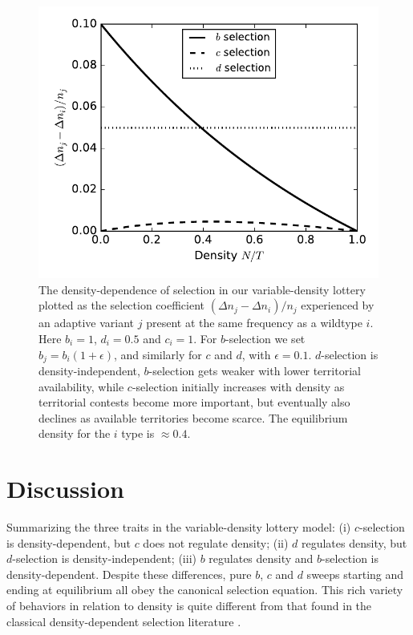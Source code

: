\documentclass[12pt]{article}
\begin{document}
\begin{figure}
\centering
\includegraphics[scale=0.8]{DDS_lottery.pdf}
\caption{\label{fig:DDS_lottery} The density-dependence of selection in our variable-density lottery plotted as the selection coefficient $(\Delta n_j-\Delta n_i)/n_j$ experienced by an adaptive variant $j$ present at the same frequency as a wildtype $i$. Here $b_i=1$, $d_i=0.5$ and $c_i=1$. For $b$-selection we set $b_j=b_i(1+\epsilon)$, and similarly for $c$ and $d$, with $\epsilon=0.1$. $d$-selection is density-independent, $b$-selection gets weaker with lower territorial availability, while $c$-selection initially increases with density as territorial contests become more important, but eventually also declines as  available territories become scarce. The equilibrium density for the $i$ type is $\approx 0.4$.}
\end{figure}

\section*{Discussion}

Summarizing the three traits in the variable-density lottery model: (i) $c$-selection is density-dependent, but $c$ does not regulate density; (ii) $d$ regulates density, but $d$-selection is density-independent; (iii) $b$ regulates density and $b$-selection is density-dependent. Despite these differences, pure $b$, $c$ and $d$ sweeps starting and ending at equilibrium all obey the canonical selection equation. This rich variety of behaviors in relation to density is quite different from that found in the classical density-dependent selection literature \citep{roughgarden_1979,christiansen_2004}. 
\end{document}
